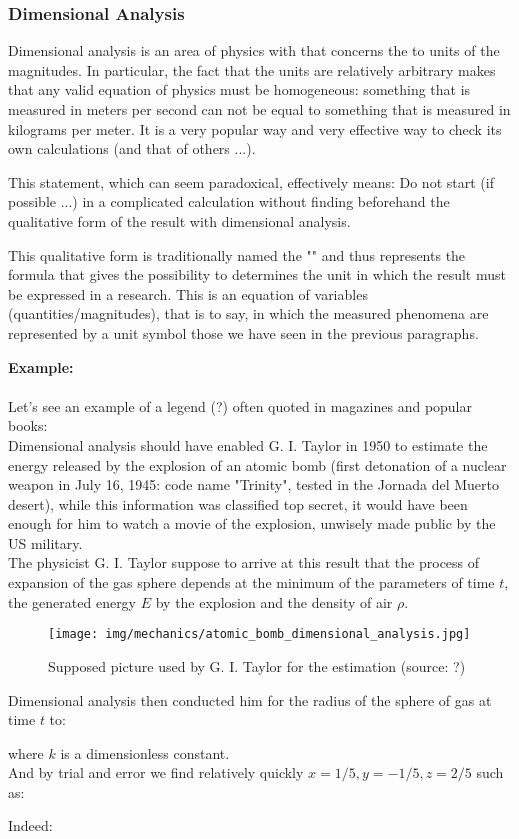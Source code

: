 	
	\subsubsection{Dimensional Analysis}
	Dimensional analysis is an area of physics with that concerns the to units of the magnitudes. In particular, the fact that the units are relatively arbitrary makes that any valid equation of physics must be homogeneous: something that is measured in meters per second can not be equal to something that is measured in kilograms per meter. It is a very popular way and very effective way to check its own calculations (and that of others ...).
	
	This statement, which can seem paradoxical, effectively means: Do not start (if possible ...) in a complicated calculation without finding beforehand the qualitative form of the result with dimensional analysis.
	
	This qualitative form is traditionally named the "" and thus represents the formula that gives the possibility to determines the unit in which the result must be expressed in a research. This is an equation of variables (quantities/magnitudes), that is to say, in which the measured phenomena are represented by a unit symbol those we have seen in the previous paragraphs.
	
	\begin{tcolorbox}[colframe=black,colback=white,sharp corners]
	\textbf{{\Large {}}Example:}\\\\
	Let's see an example of a legend (?) often quoted in magazines and popular books:\\
	
	Dimensional analysis should have enabled G. I. Taylor in 1950 to estimate the energy released by the explosion of an atomic bomb (first detonation of a nuclear weapon in July 16, 1945: code name "Trinity", tested in the Jornada del Muerto desert), while this information was classified top secret, it would have been enough for him to watch a movie of the explosion, unwisely made public by the US military.\\
	
	The physicist G. I. Taylor suppose to arrive at this result that the process of expansion of the gas sphere depends at the minimum of the parameters of time $t$, the generated energy $E$ by the explosion and the density of air $\rho$.\\ 
	\begin{figure}[H]
		\centering
		\texttt{[image: img/mechanics/atomic\_bomb\_dimensional\_analysis.jpg]}
		\caption{Supposed picture used by G. I. Taylor for the estimation (source: ?)}
	\end{figure}
	Dimensional analysis then conducted him for the radius of the sphere of gas at time $t$ to:
	
	where $k$ is a dimensionless constant.\\
	
	And by trial and error we find relatively quickly $x=1/5,y=-1/5,z=2/5$  such as:
	
	Indeed:
	\end{tcolorbox}
	
